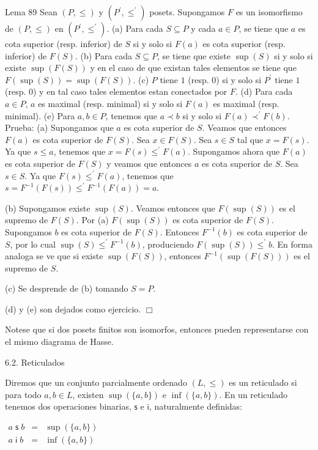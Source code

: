 Lema 89 Sean \((P,\leq )\) y \((P^{\prime },\leq ^{\prime })\) posets. Supongamos \(F\) es un isomorfismo de \((P,\leq )\) en \((P^{\prime },\leq ^{\prime })\).
(a) Para cada \(S\subseteq P\) y cada \(a\in P\), se tiene que \(a\) es cota superior (resp. inferior) de \(S\) si y solo si \(F(a)\) es cota superior (resp. inferior) de \(F(S)\).
(b) Para cada \(S\subseteq P\), se tiene que existe \(\sup (S)\) si y solo si existe \(\sup (F(S))\) y en el caso de que existan tales elementos se tiene que \(F(\sup (S))=\sup (F(S))\).
(c) \(P\) tiene \(1\) (resp. \(0\)) si y solo si \(P^{\prime }\) tiene \(1\) (resp. \(0\)) y en tal caso tales elementos estan conectados por \(F\).
(d) Para cada \(a\in P\), \(a\) es maximal (resp. minimal) si y solo si \( F(a)\) es maximal (resp. minimal).
(e) Para \(a,b\in P\), tenemos que \(a\prec b\) si y solo si \(F(a)\prec ^{\prime }F(b)\).
Prueba: (a) Supongamos que \(a\) es cota superior de \(S\). Veamos que entonces \(F(a)\) es cota superior de \(F(S)\). Sea \(x\in F(S)\). Sea \(s\in S\) tal que \(x=F(s)\). Ya que \(s\leq a\), tenemos que \(x=F(s)\leq ^{\prime }F(a)\). Supongamos ahora que \(F(a)\) es cota superior de \(F(S)\) y veamos que entonces \(a\) es cota superior de \(S\). Sea \(s\in S\). Ya que \(F(s)\leq ^{\prime }F(a)\), tenemos que \(s=F^{-1}(F(s))\leq ^{\prime }F^{-1}(F(a))=a\).

(b) Supongamos existe \(\sup (S)\). Veamos entonces que \(F(\sup (S))\) es el supremo de \(F(S)\). Por (a) \(F(\sup (S))\) es cota superior de \(F(S)\). Supongamos \(b\) es cota superior de \(F(S)\). Entonces \(F^{-1}(b)\) es cota superior de \(S\), por lo cual \(\sup (S)\leq ^{\prime }F^{-1}(b)\), produciendo \(F(\sup (S))\leq ^{\prime }b\). En forma analoga se ve que si existe \(\sup (F(S))\), entonces \(F^{-1}(\sup (F(S)))\) es el supremo de \(S\).

(c) Se desprende de (b) tomando \(S=P\).

(d) y (e) son dejados como ejercicio. \(\Box\)

Notese que si dos posets finitos son isomorfos, entonces pueden representarse con el mismo diagrama de Hasse.

6.2. Reticulados

Diremos que un conjunto parcialmente ordenado \((L,\leq )\) es un reticulado si para todo \(a,b\in L\), existen \(\sup (\{a,b\})\) e \(\inf (\{a,b\})\). En un reticulado tenemos dos operaciones binarias, \(\mathsf{s}\) e \(\mathsf{i}\), naturalmente definidas:

\(\displaystyle \begin{array}{rcl} a\mathsf{\;s\;}b & =& \sup (\{a,b\}) \\ a\mathsf{\;i\;}b & =& \inf (\{a,b\}) \end{array} \)

